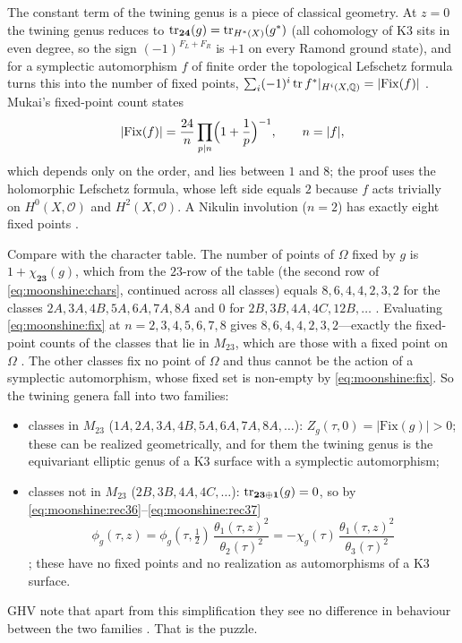 The constant term of the twining genus is a piece of classical geometry. At $z=0$ the
twining genus reduces to $\operatorname{tr}_{\mathbf{24}}(g)=\operatorname{tr}_{H^*(X)}(g^*)$ (all cohomology of K3
sits in even degree, so the sign $(-1)^{F_L+F_R}$ is $+1$ on every Ramond ground state), and
for a symplectic automorphism $f$ of finite order the topological Lefschetz formula turns
this into the number of fixed points, $\sum_i(-1)^i\operatorname{tr} f^*|_{H^i(X,\mathbb{Q})}=|\mathrm{Fix}(f)|$
. Mukai's fixed-point count states
\begin{equation}\label{eq:moonshine:fix}
  |\mathrm{Fix}(f)|=\frac{24}{n}\prod_{p\mid n}\Bigl(1+\frac1p\Bigr)^{-1},\qquad n=|f|,
\end{equation}
which depends only on the order, and lies between $1$ and $8$; the proof uses the
holomorphic Lefschetz formula, whose left side equals $2$ because $f$ acts trivially on
$H^0(X,\mathcal O)$ and $H^2(X,\mathcal O)$. A Nikulin involution ($n=2$) has exactly
eight fixed points .

Compare with the character table. The number of points of $\Omega$ fixed by $g$ is
$1+\chi_{\mathbf{23}}(g)$, which from the $23$-row of the table (the second row of
\eqref{eq:moonshine:chars}, continued across all classes) equals
$8,6,4,4,2,3,2$ for the classes $2A,3A,4B,5A,6A,7A,8A$ and $0$ for $2B,3B,4A,4C,12B,\dots$
. Evaluating \eqref{eq:moonshine:fix} at
$n=2,3,4,5,6,7,8$ gives $8,6,4,4,2,3,2$---exactly the fixed-point counts of the classes
that lie in $M_{23}$, which are those with a fixed point on $\Omega$
. The other classes fix no point of $\Omega$ and thus cannot
be the action of a symplectic automorphism, whose fixed set is non-empty by
\eqref{eq:moonshine:fix}. So the twining genera fall into two families:
\begin{itemize}[leftmargin=*]
\item classes in $M_{23}$ ($1A,2A,3A,4B,5A,6A,7A,8A,\dots$): $Z_g(\tau,0)=|\mathrm{Fix}(g)|>0$;
  these can be realized geometrically, and for them the twining genus is the equivariant
  elliptic genus of a K3 surface with a symplectic automorphism;
\item classes not in $M_{23}$ ($2B,3B,4A,4C,\dots$): $\operatorname{tr}_{\mathbf{23}\oplus\mathbf1}(g)=0$,
  so by \eqref{eq:moonshine:rec36}--\eqref{eq:moonshine:rec37}
  \[
    \phi_g(\tau,z)=\phi_g(\tau,\tfrac12)\,\frac{\theta_1(\tau,z)^2}{\theta_2(\tau)^2}
    =-\chi_g(\tau)\,\frac{\theta_1(\tau,z)^2}{\theta_3(\tau)^2}
  \]
  ; these have no fixed points and no realization as
  automorphisms of a K3 surface.
\end{itemize}
GHV note that apart from this simplification they see no difference in behaviour between
the two families . That is the puzzle.

